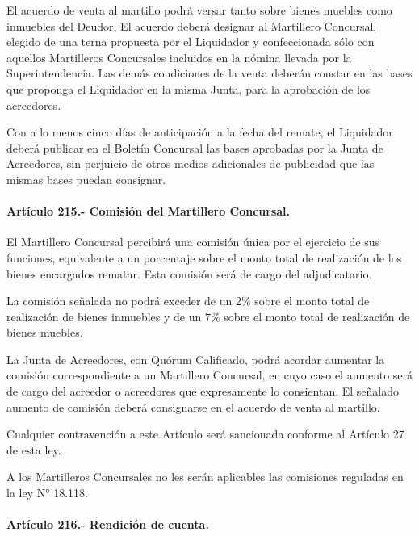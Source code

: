 \documentclass[
]{book}
\begin{document}
El acuerdo de venta al martillo podrá versar tanto sobre bienes muebles como inmuebles del Deudor. El acuerdo deberá designar al Martillero Concursal, elegido de una terna propuesta por el Liquidador y confeccionada sólo con aquellos Martilleros Concursales incluidos en la nómina llevada por la Superintendencia. Las demás condiciones de la venta deberán constar en las bases que proponga el Liquidador en la misma Junta, para la aprobación de los acreedores.

Con a lo menos cinco días de anticipación a la fecha del remate, el Liquidador deberá publicar en el Boletín Concursal las bases aprobadas por la Junta de Acreedores, sin perjuicio de otros medios adicionales de publicidad que las mismas bases puedan consignar.

\hypertarget{artuxedculo-215.--comisiuxf3n-del-martillero-concursal.}{%
\paragraph*{Artículo 215.- Comisión del Martillero Concursal.}\label{artuxedculo-215.--comisiuxf3n-del-martillero-concursal.}}

El Martillero Concursal percibirá una comisión única por el ejercicio de sus funciones, equivalente a un porcentaje sobre el monto total de realización de los bienes encargados rematar. Esta comisión será de cargo del adjudicatario.

La comisión señalada no podrá exceder de un 2\% sobre el monto total de realización de bienes inmuebles y de un 7\% sobre el monto total de realización de bienes muebles.

La Junta de Acreedores, con Quórum Calificado, podrá acordar aumentar la comisión correspondiente a un Martillero Concursal, en cuyo caso el aumento será de cargo del acreedor o acreedores que expresamente lo consientan. El señalado aumento de comisión deberá consignarse en el acuerdo de venta al martillo.

Cualquier contravención a este Artículo será sancionada conforme al Artículo 27 de esta ley.

A los Martilleros Concursales no les serán aplicables las comisiones reguladas en la ley N° 18.118.

\hypertarget{artuxedculo-216.--rendiciuxf3n-de-cuenta.}{%
\paragraph*{Artículo 216.- Rendición de cuenta.}\label{artuxedculo-216.--rendiciuxf3n-de-cuenta.}}
\end{document}

